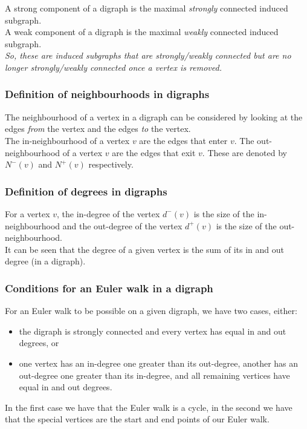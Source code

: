 \documentclass[a4paper, 12pt, twoside]{article}
\begin{document}
A strong component of a digraph is the maximal \textit{strongly}
connected induced subgraph.
\\[\baselineskip]
A weak component of a digraph is the maximal \textit{weakly}
connected induced subgraph.
\\[\baselineskip]
\textit{So, these are induced subgraphs that are strongly/weakly
connected but are no longer strongly/weakly connected once a
vertex is removed.}

\subsubsection{Definition of neighbourhoods in digraphs}

The neighbourhood of a vertex in a digraph can be considered by
looking at the edges \textit{from} the vertex and the edges
\textit{to} the vertex.
\\[\baselineskip]
The in-neighbourhood of a vertex $v$ are the edges that enter $v$.
The out-neighbourhood of a vertex $v$ are the edges that exit $v$.
These are denoted by $N^-(v)$ and $N^+(v)$ respectively.

\subsubsection{Definition of degrees in digraphs}

For a vertex $v$, the in-degree of the vertex $d^-(v)$ is the size of
the in-neighbourhood and the out-degree of the vertex $d^+(v)$
is the size of the out-neighbourhood.
\\[\baselineskip]
It can be seen that the degree of a given vertex is the sum of
its in and out degree (in a digraph).

\newpage

\subsubsection{Conditions for an Euler walk in a digraph}

For an Euler walk to be possible on a given digraph, we have
two cases, either:\begin{itemize}
  \item the digraph is strongly connected and every vertex
  has equal in and out degrees, or
  \item one vertex has an in-degree one greater than its out-degree,
  another has an out-degree one greater than its in-degree, and all
  remaining vertices have equal in and out degrees.
\end{itemize}
In the first case we have that the Euler walk is a cycle, 
in the second we have that the special vertices are the start and end
points of our Euler walk. 
\end{document}
